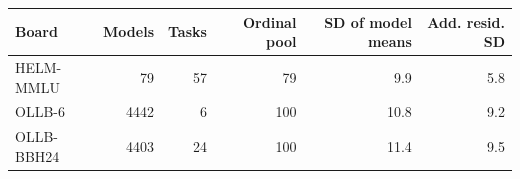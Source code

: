 \begin{tabular}{lrrrrr}\toprule
Board & Models & Tasks & Ordinal pool & SD of model means & Add. resid. SD\\\midrule
HELM-MMLU & 79 & 57 & 79 & 9.9 & 5.8\\
OLLB-6 & 4442 & 6 & 100 & 10.8 & 9.2\\
OLLB-BBH24 & 4403 & 24 & 100 & 11.4 & 9.5\\
\bottomrule\end{tabular}
